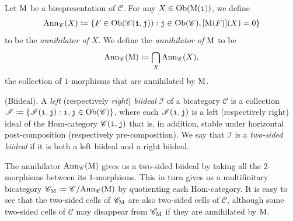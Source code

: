 \noindent Let $\textup{M}$ be a birepresentation of $\mathscr{C}$. For any $X \in \textnormal{Ob}(\textup{M}(\textnormal{\texttt{i}}))$, we define
\begin{align*}
\begin{split}
\textup{Ann}_\mathscr{C}(X) \coloneqq \{F \in \textnormal{Ob}(\mathscr{C}(\textnormal{\texttt{i}}, \textnormal{\texttt{j}})) : \textnormal{\texttt{j}} \in \textnormal{Ob}(\mathscr{C}), [\textup{M}(F)](X) = 0\}
\end{split}
\end{align*}
\noindent to be the {\em annihilator of $X$}. %
We define the {\em annihilator of $\textup{M}$} to be
\begin{align*}
\begin{split}
\textup{Ann}_\mathscr{C}(\textup{M}) \coloneqq \bigcap_{X} \textup{Ann}_\mathscr{C}(X),
\end{split}
\end{align*}
\noindent the collection of $1$-morphisms that are annihilated by $\textup{M}$.\\ %

\noindent\begin{definition}\textup{(Biideal).} A {\em left} (respectively {\em right}) {\em biideal} $\mathscr{I}$ of a bicategory $\mathscr{C}$ is a collection\linebreak $\mathscr{I} \coloneqq \{\mathscr{I}(\textnormal{\texttt{i}}, \textnormal{\texttt{j}}) : \textnormal{\texttt{i}}, \textnormal{\texttt{j}} \in \textnormal{Ob}(\mathscr{C})\}$, where each $\mathscr{I}(\textnormal{\texttt{i}}, \textnormal{\texttt{j}})$ is a left (respectively right) ideal of the Hom-category $\mathscr{C}(\textnormal{\texttt{i}}, \textnormal{\texttt{j}})$ that is, in addition, stable under horizontal post-composition (respectively pre-composition). We say that $\mathscr{I}$ is a {\em two-sided biideal} if it is both a left biideal and a right biideal.\\
\end{definition}

\noindent The annihilator $\textup{Ann}_\mathscr{C}(\textup{M})$ gives us a two-sided biideal by taking all the $2$-morphisms between its $1$-morphisms. This in turn gives us a multifinitary bicategory $\mathscr{C}_\textup{M} \coloneqq \mathscr{C}/\textup{Ann}_\mathscr{C}(\textup{M})$ by quotienting each Hom-category. It is easy to see that the two-sided cells of $\mathscr{C}_\textup{M}$ are also two-sided cells of $\mathscr{C}$, although some two-sided cells of $\mathscr{C}$ may disappear from $\mathscr{C}_\textup{M}$ if they are annihilated by $\textup{M}$.\\

